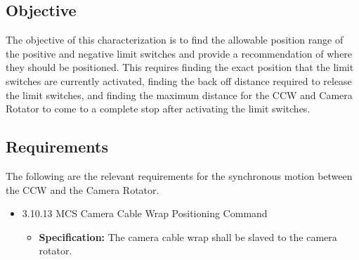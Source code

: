 \documentclass[SE,lsstdraft,authoryear,toc]{lsstdoc}
\begin{document}
\subsection{Objective}

The objective of this characterization is to find the allowable position
range of the positive and negative limit switches and provide a
recommendation of where they should be positioned. This requires finding
the exact position that the limit switches are currently activated,
finding the back off distance required to release the limit switches,
and finding the maximum distance for the CCW and Camera Rotator to come
to a complete stop after activating the limit switches.

\subsection{Requirements}

The following are the relevant requirements for the synchronous motion
between the CCW and the Camera Rotator.

\underline{}

\begin{itemize}
\item
  3.10.13 MCS Camera Cable Wrap Positioning Command

  \begin{itemize}
  \item
    \textbf{Specification:} The camera cable wrap shall be slaved to the
    camera rotator.
  \end{itemize}
\end{itemize}

\underline{}
\end{document}
